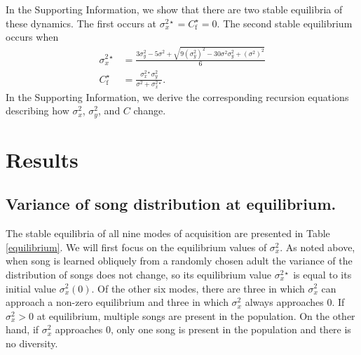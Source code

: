 \documentclass{article}
\newcommand{\x}[1]{\text{#1}}
\begin{document}
In the Supporting Information, we show that there are two stable equilibria of these dynamics. The first occurs at $\sigma_x^{2\star}=C_\x{f}^\star=0$. The second stable equilibrium occurs when
\begin{align*}
\sigma_x^{2\star}&=\frac{3\sigma_y^2-5\sigma^2+\sqrt{9(\sigma_y^2)^2-30\sigma^2\sigma_y^2+(\sigma^2)^2}}{6}
\\ C_\x{f}^\star&=\frac{\sigma_x^{2\star}\sigma_y^2}{\sigma^2+\sigma_x^{2\star}}.
\end{align*}
In the Supporting Information, we derive the corresponding recursion equations describing how $\sigma_x^2$, $\sigma_y^2$, and $C$ change.

\section*{Results}
\subsection*{Variance of song distribution at equilibrium. }
The stable equilibria of all nine modes of acquisition are presented in Table \ref{equilibrium}. We will first focus on the equilibrium values of $\sigma_x^2$. As noted above, when song is learned obliquely from a randomly chosen adult the variance of the distribution of songs does not change, so its equilibrium value $\sigma_x^{2\star}$ is equal to its initial value $\sigma_x^2(0)$. Of the other six modes, there are three in which $\sigma_x^2$ can approach a non-zero equilibrium and three in which $\sigma_x^2$ always approaches $0$.  If $\sigma_x^2>0$ at equilibrium, multiple songs are present in the population. On the other hand, if $\sigma_x^2$ approaches $0$, only one song is present in the population and there is no diversity.
\end{document}
